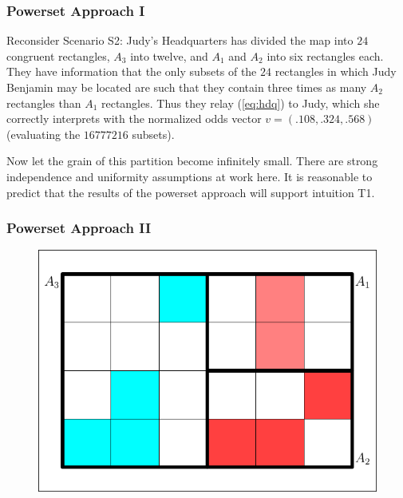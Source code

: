 \documentclass[xcolor=dvipsnames]{beamer}
\begin{document}
\begin{frame}
  \frametitle{Powerset Approach I}
  Reconsider Scenario S2: Judy's Headquarters has divided the map
  into $24$ congruent rectangles, $A_{3}$ into twelve, and $A_{1}$
  and $A_{2}$ into six rectangles each. They have information that
  the only subsets of the $24$ rectangles in which Judy Benjamin
  may be located are such that they contain three times as many
  $A_{2}$ rectangles than $A_{1}$ rectangles. Thus they relay
  ({\ref{eq:hdq}}) to Judy, which she correctly interprets with
  the normalized odds vector $v=(.108,.324,.568)$ (evaluating the
  $16777216$ subsets).

\mbox{}

  Now let the grain of this partition become infinitely small.
  There are strong independence and uniformity assumptions at work
  here. It is reasonable to predict that the results of the
  powerset approach will support intuition T1.
\end{frame}

\begin{frame}
  \frametitle{Powerset Approach II}
\begin{figure}[h]
\includegraphics[scale=.7]{../diagrams/partition-2.pdf}
\end{figure}
\end{frame}
\end{document}
